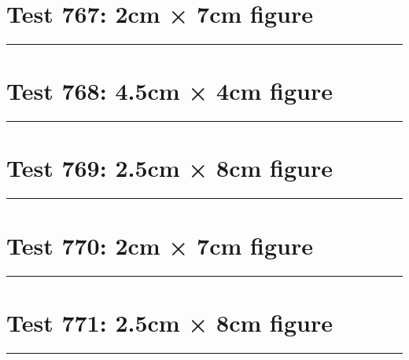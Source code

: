 \documentclass[a4paper,11pt]{article}
\begin{document}
\section*{Test 767: 2cm × 7cm figure}
\begin{swarmwrap}%
  \begin{minipage}[t]{2cm}
    \centering
    \rule{\linewidth}{7cm}
  \end{minipage}%
\end{swarmwrap}%
\swarmwrapnext
\lipsum[110]
\lipsum[111]
\lipsum[112]
\section*{Test 768: 4.5cm × 4cm figure}
\begin{swarmwrap}%
  \begin{minipage}[t]{4cm}
    \centering
    \rule{\linewidth}{4cm}
  \end{minipage}%
\end{swarmwrap}%
\swarmwrapnext
\lipsum[20]
\lipsum[21]
\lipsum[22]
\lipsum[23]
\lipsum[24]
\lipsum[25]
\section*{Test 769: 2.5cm × 8cm figure}
\begin{swarmwrap}%
  \begin{minipage}[t]{2cm}
    \centering
    \rule{\linewidth}{8cm}
  \end{minipage}%
\end{swarmwrap}%
\swarmwrapnext
\lipsum[28]
\lipsum[29]
\lipsum[30]
\section*{Test 770: 2cm × 7cm figure}
\begin{swarmwrap}%
  \begin{minipage}[t]{2cm}
    \centering
    \rule{\linewidth}{7cm}
  \end{minipage}%
\end{swarmwrap}%
\swarmwrapnext
\lipsum[78]
\lipsum[79]
\lipsum[80]
\lipsum[81]
\lipsum[82]
\section*{Test 771: 2.5cm × 8cm figure}
\begin{swarmwrap}%
  \begin{minipage}[t]{2cm}
    \centering
    \rule{\linewidth}{8cm}
  \end{minipage}%
\end{swarmwrap}%
\swarmwrapnext
\lipsum[38]
\lipsum[39]
\lipsum[40]
\lipsum[41]
\end{document}
